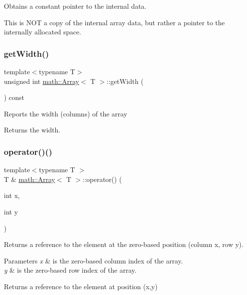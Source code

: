 Obtains a constant pointer to the internal data.

This is N\+OT a copy of the internal array data, but rather a pointer to the internally allocated space. \mbox{\label{classmath_1_1_array_aed1d255a072e2026f8fc7cb037d0697b}} 
\subsubsection{\texorpdfstring{get\+Width()}{getWidth()}}
{\footnotesize\ttfamily template$<$typename T$>$ \\
unsigned int \hyperlink{classmath_1_1_array}{math\+::\+Array}$<$ T $>$\+::get\+Width (\begin{DoxyParamCaption}{ }\end{DoxyParamCaption}) const\hspace{0.3cm}{\ttfamily [inline]}}

Reports the width (columns) of the array

\begin{DoxyReturn}{Returns}
the width. 
\end{DoxyReturn}
\mbox{\label{classmath_1_1_array_a27f8eda2c4250a127826d697ebfb43ed}} 
\subsubsection{\texorpdfstring{operator()()}{operator()()}\hspace{0.1cm}{\footnotesize\ttfamily [1/2]}}
{\footnotesize\ttfamily template$<$typename T $>$ \\
T \& \hyperlink{classmath_1_1_array}{math\+::\+Array}$<$ T $>$\+::operator() (\begin{DoxyParamCaption}\item[{int}]{x,  }\item[{int}]{y }\end{DoxyParamCaption})}

Returns a reference to the element at the zero-\/based position (column x, row y).


\begin{DoxyParams}{Parameters}
{\em x} & is the zero-\/based column index of the array. \\
\hline
{\em y} & is the zero-\/based row index of the array.\\
\hline
\end{DoxyParams}
\begin{DoxyReturn}{Returns}
a reference to the element at position (x,y) 
\end{DoxyReturn}
\mbox{\label{classmath_1_1_array_a24d7818828f26077fd029e48a87acc31}} 
